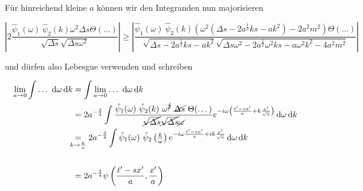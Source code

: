 Für hinreichend kleine $a$ können wir den Integranden nun majorisieren

\begin{dmath*}
    \left|
    2 \frac{
        \hat\psi_1(\omega) ~\hat\psi_2(k) \omega^2 \Delta s \Theta(\dots)}
    {
        \sqrt{\Delta s} \sqrt{\Delta s \omega^2}
    }
    \right|
    \geq
    \left|
    \frac{
        \hat\psi_1(\omega)~ \hat\psi_2(k) \left(
        \omega^2 \left(\Delta s - 2 a^{\frac{1}{2}} k s - ak^2
                \right) - 2a^2m^2
        \right)
         \Theta(\dots)
     }
     {
        \sqrt{\Delta s -2a^{\frac{1}{2}}ks - ak^2}
            \sqrt{\Delta s \omega^2 -2a^{\frac{1}{2}} \omega^2 k s
                    - a\omega^2k^2-4 a^2 m^2}
     }
    \right|
\end{dmath*}

und dürfen also Lebesgue verwenden und schreiben

\begin{align*}
    \lim_{a \rightarrow 0} \int \dots ~\d \omega \d k
    &=
    \int \lim_{a \rightarrow 0} \dots ~\d \omega \d k
    \\ &=
    2 a^{-\frac{3}{4}} \int
    \frac{\hat\psi_1(\omega) ~\hat\psi_2(k) ~\omega^{\cancel{2}}
        ~\cancel{\Delta s} ~\Theta(\dots)
    }
    {
        \cancel{\sqrt{\Delta s}}\cancel{\sqrt{\Delta s}}\cancel{\omega}
    }
    e^{-i \omega \left(\frac{t'-sx'}{a} + k \frac{x'}{\sqrt{a}}\right)}
    \d \omega \d k
    \\ & \kern -.6em\underset{k\rightarrow \frac{k}{\omega}}{=}
    2 a^{-\frac{3}{4}} \int
    \hat\psi_1(\omega) ~\hat\psi_2\left(\tfrac{k}{\omega}\right)
    e^{-i\omega \frac{t'-sx'}{a} + ik \frac{x'}{\sqrt{a}}}
    \d \omega \d k \\
    \\ &=
    2 a^{-\frac{3}{4}} \psi \left(\frac{t'-sx'}{a}, \frac{x'}{a}\right)
\end{align*}

